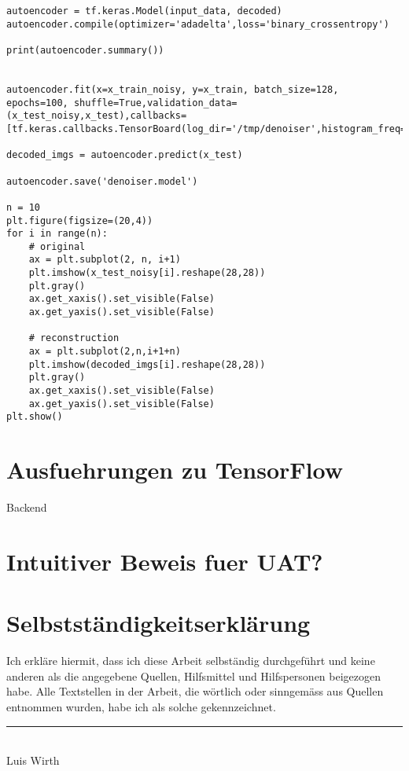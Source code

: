 \begin{appendices}
\begin{verbatim}
autoencoder = tf.keras.Model(input_data, decoded)
autoencoder.compile(optimizer='adadelta',loss='binary_crossentropy')

print(autoencoder.summary())


autoencoder.fit(x=x_train_noisy, y=x_train, batch_size=128, epochs=100, shuffle=True,validation_data=(x_test_noisy,x_test),callbacks=[tf.keras.callbacks.TensorBoard(log_dir='/tmp/denoiser',histogram_freq=0,write_graph=False)])

decoded_imgs = autoencoder.predict(x_test)

autoencoder.save('denoiser.model')

n = 10
plt.figure(figsize=(20,4))
for i in range(n):
    # original
    ax = plt.subplot(2, n, i+1)
    plt.imshow(x_test_noisy[i].reshape(28,28))
    plt.gray()
    ax.get_xaxis().set_visible(False)
    ax.get_yaxis().set_visible(False)

    # reconstruction
    ax = plt.subplot(2,n,i+1+n)
    plt.imshow(decoded_imgs[i].reshape(28,28))
    plt.gray()
    ax.get_xaxis().set_visible(False)
    ax.get_yaxis().set_visible(False)
plt.show()
\end{verbatim}

\chapter{Ausfuehrungen zu TensorFlow}
Backend

\chapter{Intuitiver Beweis fuer UAT?}

\end{appendices}

\printbibliography[heading=bibintoc]
\pagebreak

\listoffigures
\pagebreak

\listoftables
\pagebreak

\chapter*{Selbstständigkeitserklärung}
Ich erkläre hiermit, dass ich diese Arbeit selbständig durchgeführt und keine anderen als die angegebene Quellen, Hilfsmittel und Hilfspersonen beigezogen habe. Alle Textstellen in der Arbeit, die wörtlich oder sinngemäss aus Quellen entnommen wurden, habe ich als solche gekennzeichnet.

\vspace{2cm}
\begin{center}
  \noindent\rule{5cm}{0.4pt}\\
  Luis Wirth
\end{center}



